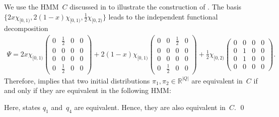 \documentclass[a4paper,UKenglish,cleveref, autoref,mathscr]{lipics-v2019}
\newcommand{\RR}{\mathbb{R}}
\newcommand{\1}{\mathbbm{1}}
\begin{document}
\begin{example}\label{indfuncdecompex}
We use the HMM~$C$ discussed in  to illustrate the construction of .
The basis $\{2x\chi_{[0,1)}, 2(1-x)\chi_{[0,1)}, \frac12\chi_{[0,2)}\}$ leads to the independent functional decomposition
\begin{multline*}
\Psi = 2x\chi_{[0,1)}\begin{pmatrix}
0 & \frac12  & 0 & 0 \\
0 & 0 & 0 & 0 \\
0 & 0 & 0 & 0 \\
0 & \frac12 & 0 & 0
\end{pmatrix} + 2(1 - x)\chi_{[0,1)}\begin{pmatrix}
0 & 0  & \frac12 & 0 \\
0 & 0 & 0 & 0 \\
0 & 0 & 0 & 0 \\
0 & \frac12 & 0 & 0
\end{pmatrix} + \frac12 \chi_{[0,2)}\begin{pmatrix}
0 & 0  & 0 & 0 \\
0 & 1 & 0 & 0 \\
0 & 1 & 0 & 0 \\
0 & 0 & 0 & 0
\end{pmatrix}.
\end{multline*}
Therefore,  implies that two initial distributions $\pi_1, \pi_2 \in \RR^{|Q|}$ are equivalent in~$C$ if and only if they are equivalent in the following HMM:
\begin{center}
\end{center}
Here, states $q_1$ and~$q_4$ are equivalent.
Hence, they are also equivalent in~$C$.
\qed
\end{example}
\end{document}
